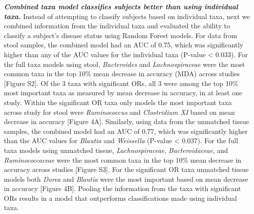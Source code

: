 \documentclass[12pt,]{article}
\begin{document}
\textbf{\emph{Combined taxa model classifies subjects better than using
individual taxa.}} Instead of attempting to classify subjects based on
individual taxa, next we combined information from the individual taxa
and evaluated the ability to classify a subject's disease status using
Random Forest models. For data from stool samples, the combined model
had an AUC of 0.75, which was significantly higher than any of the AUC
values for the individual taxa (P-value \textless{} 0.033). For the full
taxa models using stool, \emph{Bacteroides} and \emph{Lachnospiraceae}
were the most common taxa in the top 10\% mean decrease in accuracy
(MDA) across studies {[}Figure S2{]}. Of the 3 taxa with significant
ORs, all 3 were among the top 10\% most important taxa as measured by
mean decrease in accuracy, in at least one study. Within the significant
OR taxa only models the most important taxa across study for stool were
\emph{Ruminococcus} and \emph{Clostridium XI} based on mean decrease in
accuracy {[}Figure 4A{]}. Similarly, using data from the unmatched
tissue samples, the combined model had an AUC of 0.77, which was
significantly higher than the AUC values for \emph{Blautia} and
\emph{Weissella} (P-value \textless{} 0.037). For the full taxa models
using unmatched tissue, \emph{Lachnospiraceae}, \emph{Bacteroidaceae},
and \emph{Ruminococcaceae} were the most common taxa in the top 10\%
mean decrease in accuracy across studies {[}Figure S3{]}. For the
significant OR taxa unmatched tissue models both \emph{Dorea} and
\emph{Blautia} were the most important based on mean decrease in
accuracy {[}Figure 4B{]}. Pooling the information from the taxa with
significant ORs results in a model that outperforms classifications made
using individual taxa.
\end{document}
